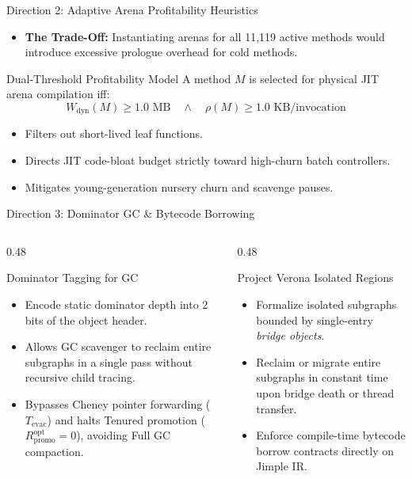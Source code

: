 \documentclass[11pt]{beamer}
\begin{document}
\begin{frame}{Direction 2: Adaptive Arena Profitability Heuristics}
  \begin{itemize}
    \item \textbf{The Trade-Off:} Instantiating arenas for all 11,119 active methods would introduce excessive prologue overhead for cold methods.
  \end{itemize}

  \begin{block}{Dual-Threshold Profitability Model}
    A method $M$ is selected for physical JIT arena compilation iff:
    $$W_{\text{dyn}}(M) \ge 1.0\text{ MB} \quad \land \quad \rho(M) \ge 1.0\text{ KB/invocation}$$
    \begin{itemize}
      \item Filters out short-lived leaf functions.
      \item Directs JIT code-bloat budget strictly toward high-churn batch controllers.
      \item Mitigates young-generation nursery churn and scavenge pauses.
    \end{itemize}
  \end{block}
\end{frame}

\begin{frame}{Direction 3: Dominator GC \& Bytecode Borrowing}
  \begin{columns}[T]
    \begin{column}{0.48\textwidth}
      \begin{block}{Dominator Tagging for GC}
        \small
        \begin{itemize}\setlength{\itemsep}{2pt}
          \item Encode static dominator depth into 2 bits of the object header.
          \item Allows GC scavenger to reclaim entire subgraphs in a single pass without recursive child tracing.
          \item Bypasses Cheney pointer forwarding ($T_{\text{evac}}$) and halts Tenured promotion ($R_{\text{promo}}^{\text{opt}} = 0$), avoiding Full GC compaction.
        \end{itemize}
      \end{block}
    \end{column}
    \begin{column}{0.48\textwidth}
      \begin{block}{Project Verona Isolated Regions}
        \small
        \begin{itemize}\setlength{\itemsep}{2pt}
          \item Formalize isolated subgraphs bounded by single-entry \emph{bridge objects}.
          \item Reclaim or migrate entire subgraphs in constant time upon bridge death or thread transfer.
          \item Enforce compile-time bytecode borrow contracts directly on Jimple IR.
        \end{itemize}
      \end{block}
    \end{column}
  \end{columns}
\end{frame}
\end{document}
